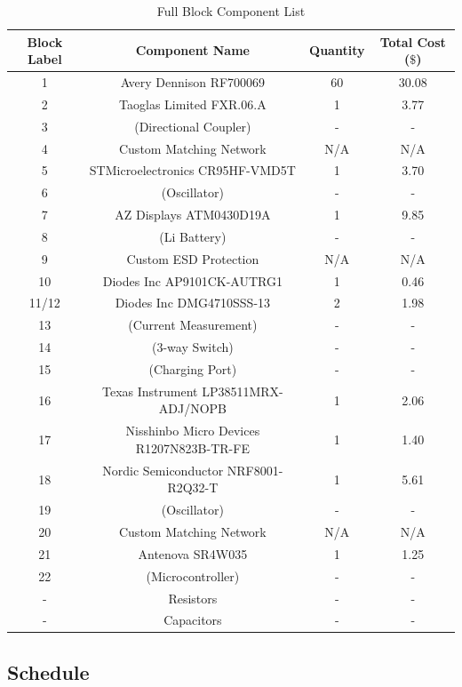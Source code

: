 \documentclass[12pt]{article}
\begin{document}
\begin{table}[h!]
	\caption{Full Block Component List}
	\label{tab:block_comps}
	\centering
	\begin{tabular}{ |c|c|c|c| } 
 		\hline
 		Block Label & Component Name & Quantity & Total Cost ($\$$) \\ 
 		\hline
 		1 & Avery Dennison RF700069 & 60 & 30.08 \\
 		2 & Taoglas Limited FXR.06.A & 1 & 3.77 \\
 		3 & (Directional Coupler) & - & - \\
 		4 & Custom Matching Network & N/A & N/A \\
 		5 & STMicroelectronics CR95HF-VMD5T & 1 & 3.70 \\
 		6 & (Oscillator) & - & - \\
 		7 & AZ Displays ATM0430D19A & 1 & 9.85 \\
 		8 & (Li Battery) & - & - \\
 		9 & Custom ESD Protection & N/A & N/A \\
 		10 & Diodes Inc AP9101CK-AUTRG1 & 1 & 0.46 \\
 		11/12 & Diodes Inc DMG4710SSS-13 & 2 & 1.98 \\
 		13 & (Current Measurement) & - & - \\
 		14 & (3-way Switch) & - & - \\
 		15 & (Charging Port) & - & - \\
 		16 & Texas Instrument LP38511MRX-ADJ/NOPB & 1 & 2.06 \\
 		17 & Nisshinbo Micro Devices R1207N823B-TR-FE & 1 & 1.40 \\
 		18 & Nordic Semiconductor NRF8001-R2Q32-T & 1 & 5.61 \\
 		19 & (Oscillator) & - & - \\
 		20 & Custom Matching Network & N/A & N/A \\
 		21 & Antenova SR4W035 & 1 & 1.25 \\
 		22 & (Microcontroller) & - & - \\
 		- & Resistors & - & - \\
 		- & Capacitors & - & - \\
 		\hline
	\end{tabular}
\end{table}

\subsection{Schedule}
\end{document}
